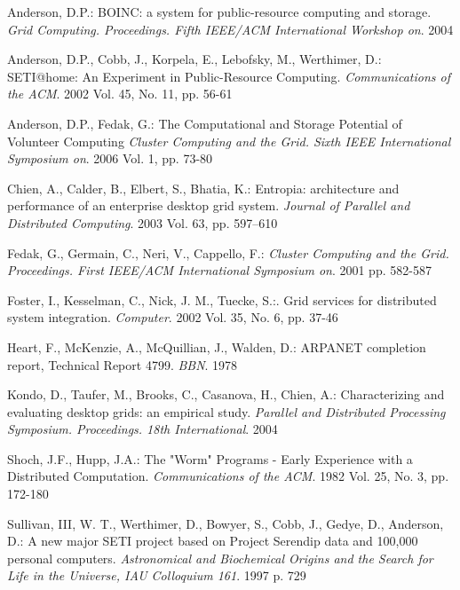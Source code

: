 \documentclass[12pt,a4paper,twoside]{article}
\begin{document}
\begingroup
\renewcommand{\section}[2]{}%
\begin{thebibliography}{99}

 Anderson, D.P.: BOINC: a system for public-resource computing and storage. \textit{Grid Computing. Proceedings. Fifth IEEE/ACM International Workshop on}. 2004

 Anderson, D.P., Cobb, J., Korpela, E., Lebofsky, M., Werthimer, D.: SETI@home: An Experiment in Public-Resource Computing. \textit{Communications of the ACM}. 2002 Vol. 45, No. 11, pp. 56-61

 Anderson, D.P., Fedak, G.: The Computational and Storage Potential of Volunteer Computing \textit{Cluster Computing and the Grid. Sixth IEEE International Symposium on}. 2006 Vol. 1, pp. 73-80

 Chien, A., Calder, B., Elbert, S., Bhatia, K.: Entropia: architecture and performance of an enterprise desktop grid system. \textit{Journal of Parallel and Distributed Computing}. 2003 Vol. 63, pp. 597–610

 Fedak, G., Germain, C., Neri, V., Cappello, F.: \textit{Cluster Computing and the Grid. Proceedings. First IEEE/ACM International Symposium on}. 2001 pp. 582-587

 Foster, I., Kesselman, C., Nick, J. M., Tuecke, S.:. Grid services for distributed system integration. \textit{Computer}. 2002 Vol. 35, No. 6, pp. 37-46

 Heart, F., McKenzie, A., McQuillian, J., Walden, D.: ARPANET completion report, Technical Report 4799. \textit{BBN}. 1978

 Kondo, D., Taufer, M., Brooks, C., Casanova, H., Chien, A.: Characterizing and evaluating desktop grids: an empirical study. \textit{Parallel and Distributed Processing Symposium. Proceedings. 18th International}. 2004

 Shoch, J.F., Hupp, J.A.: The "Worm" Programs - Early Experience with a Distributed Computation. \textit{Communications of the ACM}. 1982 Vol. 25, No. 3, pp. 172-180  

 Sullivan, III, W. T., Werthimer, D., Bowyer, S., Cobb, J., Gedye, D., Anderson, D.: A new major SETI project based on Project Serendip data and 100,000 personal computers. \textit{Astronomical and Biochemical Origins and the Search for Life in the Universe, IAU Colloquium 161}. 1997 p. 729  


\end{thebibliography}
\end{document}
